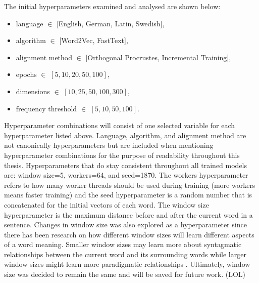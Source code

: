 



\bigskip
\bigskip
\bigskip
\bigskip
\bigskip
\bigskip
\bigskip
The initial hyperparameters examined and analysed are shown below:
\begin{itemize}
    \item language $\in$ [English, German, Latin, Swedish],
    \item algorithm $\in$ [Word2Vec, FastText],
    \item alignment method $\in$ [Orthogonal Procrustes, Incremental Training],
    \item epochs $\in$ $[5, 10, 20, 50, 100]$,
    \item dimensions $\in$ $[10, 25, 50, 100, 300]$,
    \item frequency threshold $\in$ $[5, 10, 50, 100]$.
\end{itemize}%


Hyperparameter combinations will consist of one selected variable for each hyperparameter listed above. Language, algorithm, and alignment method are not canonically hyperparameters but are included when mentioning hyperparameter combinations for the purpose of readability throughout this thesis. Hyperparameters that do stay consistent throughout all trained models are: window size=5, workers=64, and seed=1870. The workers hyperparameter refers to how many worker threads should be used during training (more workers means faster training) and the seed hyperparameter is a random number that is concatenated for the initial vectors of each word. The window size hyperparameter is the maximum distance before and after the current word in a sentence. Changes in window size was also explored as a hyperparameter since there has been research on how different window sizes will learn different aspects of a word meaning. Smaller window sizes may learn more about syntagmatic relationships between the current word and its surrounding words while larger window sizes might learn more paradigmatic relationships \citep{dca2019-nulty}. Ultimately, window size was decided to remain the same and will be saved for future work. (LOL)


